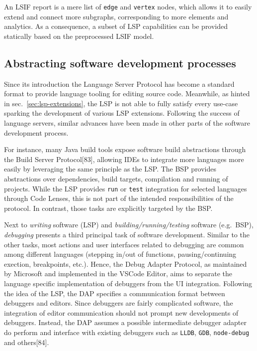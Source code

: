 \documentclass[
  a4paper,
  bibtex,
  english,
  nomenclature]{kthlatex/kththesis/kththesis}
\begin{document}
An LSIF report is a mere list of \texttt{edge} and \texttt{vertex}
nodes, which allows it to easily extend and connect more subgraphs,
corresponding to more elements and analytics. As a consequence, a subset
of LSP capabilities can be provided statically based on the preprocessed
LSIF model.

\hypertarget{sec:abstracting-software-development-processes}{%
\subsection{Abstracting software development
processes}\label{sec:abstracting-software-development-processes}}

Since its introduction the Language Server Protocol has become a
standard format to provide language tooling for editing source code.
Meanwhile, as hinted in sec.~\ref{sec:lsp-extensions}, the LSP is not
able to fully satisfy every use-case sparking the development of various
LSP extensions. Following the success of language servers, similar
advances have been made in other parts of the software development
process.

For instance, many Java build tools expose software build abstractions
through the Build Server Protocol{[}83{]}, allowing IDEs to integrate
more languages more easily by leveraging the same principle as the LSP.
The BSP provides abstractions over dependencies, build targets,
compilation and running of projects. While the LSP provides \texttt{run}
or \texttt{test} integration for selected languages through Code Lenses,
this is not part of the intended responsibilities of the protocol. In
contrast, those tasks are explicitly targeted by the BSP.

Next to \emph{writing} software (LSP) and
\emph{building/running/testing} software (e.g.~BSP), \emph{debugging}
presents a third principal task of software development. Similar to the
other tasks, most actions and user interfaces related to debugging are
common among different languages (stepping in/out of functions,
pausing/continuing exection, breakpoints, etc.). Hence, the Debug
Adapter Protocol, as maintained by Microsoft and implemented in the
VSCode Editor, aims to separate the language specific implementation of
debuggers from the UI integration. Following the idea of the LSP, the
DAP specifies a communication format between debuggers and editors.
Since debuggers are fairly complicated software, the integration of
editor communication should not prompt new developments of debuggers.
Instead, the DAP assumes a possible intermediate debugger adapter do
perform and interface with existing debuggers such as \texttt{LLDB},
\texttt{GDB}, \texttt{node-debug} and others{[}84{]}.
\end{document}
